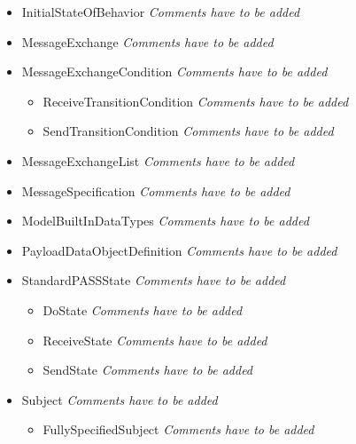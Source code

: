 \begin{itemize}
\begin{itemize}
\begin{itemize}
	\end{itemize}
	\item InitialStateOfBehavior \linebreak \textit{Comments have to be added}
	\item MessageExchange \linebreak \textit{Comments have to be added}
	\item MessageExchangeCondition \linebreak \textit{Comments have to be added}
	\begin{itemize}
		\item ReceiveTransitionCondition \linebreak \textit{Comments have to be added}
		\item SendTransitionCondition \linebreak \textit{Comments have to be added}
	\end{itemize} 
	\item MessageExchangeList \linebreak \textit{Comments have to be added}
	\item MessageSpecification \linebreak \textit{Comments have to be added}
	\item ModelBuiltInDataTypes \linebreak \textit{Comments have to be added}
	\item PayloadDataObjectDefinition \linebreak \textit{Comments have to be added}
	\item StandardPASSState \linebreak \textit{Comments have to be added}
	\begin{itemize}
		\item DoState \linebreak \textit{Comments have to be added}
		\item ReceiveState \linebreak \textit{Comments have to be added}
		\item SendState \linebreak \textit{Comments have to be added}
	\end{itemize}
	\item Subject \linebreak \textit{Comments have to be added}
	\begin{itemize}
		\item FullySpecifiedSubject \linebreak \textit{Comments have to be added}

\end{itemize}
\end{itemize}
\end{itemize}
